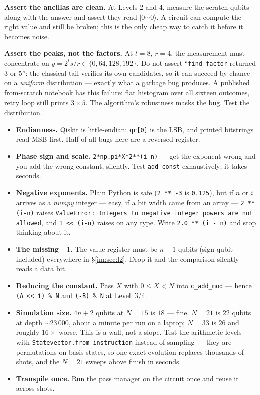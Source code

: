 \documentclass[11pt]{article}
\renewcommand{\ket}[1]{\lvert #1 \rangle}
\newcommand{\code}[1]{\texttt{#1}}
\theoremstyle{plain}
\theoremstyle{remark}
\begin{document}
\begin{keybox}[title={The two assertions that matter most}]
\textbf{Assert the ancillas are clean.} At Levels 2 and 4, measure the scratch qubits along with
the answer and assert they read $\ket{0\cdots0}$. A circuit can compute the right value and still
be broken; this is the only cheap way to catch it before it becomes noise.

\textbf{Assert the peaks, not the factors.} At $t=8$, $r=4$, the measurement must concentrate on
$y=2^ts/r\in\{0,64,128,192\}$. Do not assert ``\code{find\_factor} returned $3$ or $5$'': the
classical tail verifies its own candidates, so it can succeed by chance on a \emph{uniform}
distribution --- exactly what a garbage bug produces. A published from-scratch notebook has this
failure: flat histogram over all sixteen outcomes, retry loop still prints $3\times5$. The
algorithm's robustness masks the bug. Test the distribution.
\end{keybox}

\begin{keybox}[title={Pitfalls, in the order you will hit them}]
\begin{itemize}\setlength\itemsep{1pt}
\item \textbf{Endianness.} Qiskit is little-endian: \code{qr[0]} is the LSB, and printed bitstrings
read MSB-first. Half of all bugs here are a reversed register.
\item \textbf{Phase sign and scale.} \code{2*np.pi*X*2**(i-n)} --- get the exponent wrong and you
add the wrong constant, silently. Test \code{add\_const} exhaustively; it takes seconds.
\item \textbf{Negative exponents.} Plain Python is safe (\code{2 ** -3} is \code{0.125}), but if
$n$ or $i$ arrives as a \emph{numpy} integer --- easy, if a bit width came from an array ---
\code{2 ** (i-n)} raises \code{ValueError: Integers to negative integer powers are not allowed},
and \code{1 << (i-n)} raises on any type. Write \code{2.0 ** (i - n)} and stop thinking about it.
\item \textbf{The missing $+1$.} The value register must be $n+1$ qubits (sign qubit included)
everywhere in \S\ref{im:sec:l2}. Drop it and the comparison silently reads a data bit.
\item \textbf{Reducing the constant.} Pass $X$ with $0\le X<N$ into \code{c\_add\_mod} ---
hence \code{(A << i) \% N} and \code{(-B) \% N} at Level~3/4.
\item \textbf{Simulation size.} $4n+2$ qubits at $N=15$ is $18$ --- fine. $N=21$ is $22$ qubits at
depth ${\sim}23\,000$, about a minute per run on a laptop; $N=33$ is $26$ and roughly $16\times$
worse. This is a wall, not a slope. Test the arithmetic levels with
\code{Statevector.from\_instruction} instead of sampling --- they are permutations on basis states,
so one exact evolution replaces thousands of shots, and the $N=21$ sweeps above finish in seconds.
\item \textbf{Transpile once.} Run the pass manager on the circuit once and reuse it across shots.
\end{itemize}
\end{keybox}
\end{document}
